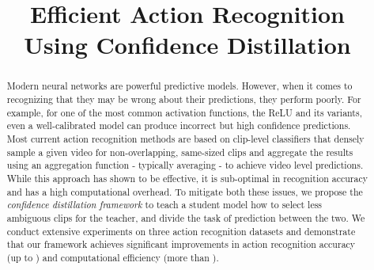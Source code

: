 \documentclass[a4paper,conference]{IEEEtran}
\begin{document}
\title{Efficient Action Recognition \\ Using Confidence Distillation}


\author{
\and
{}
\and
{}
}













\maketitle

\begin{abstract}
  Modern neural networks are powerful predictive models. However, when it comes to recognizing that they may be wrong about their predictions, they perform poorly. For example, for one of the most common activation functions, the ReLU and its variants, even a well-calibrated model can produce incorrect but high confidence predictions. Most current action recognition methods are based on clip-level classifiers that densely sample a given video for non-overlapping, same-sized clips and aggregate the results using an aggregation function - typically averaging - to achieve video level predictions. While this approach has shown to be effective, it is sub-optimal in recognition accuracy and has a high computational overhead. To mitigate both these issues, we propose the \textit{confidence distillation framework} to teach a student model how to select less ambiguous clips for the teacher, and divide the task of prediction between the two. We conduct extensive experiments on three action recognition datasets and demonstrate that our framework achieves significant improvements in action recognition accuracy (up to ) and computational efficiency (more than ).
\end{abstract}
\end{document}
